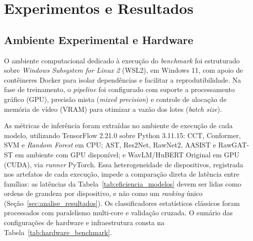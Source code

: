 \documentclass[12pt,a4paper]{article}
\begin{document}
\newpage


\section{Experimentos e Resultados}
\label{sec:resultados}

\subsection{Ambiente Experimental e Hardware}
\label{sec:ambiente_experimental}

O ambiente computacional dedicado à execução do \textit{benchmark} foi
estruturado sobre \textit{Windows Subsystem for Linux 2} (WSL2), em Windows 11,
com apoio de contêineres Docker para isolar dependências e facilitar a
reprodutibilidade. Na fase de treinamento, o \textit{pipeline} foi configurado
com suporte a processamento gráfico (GPU), precisão mista (\textit{mixed
precision}) e controle de alocação de memória de vídeo (VRAM) para otimizar a
vazão dos lotes (\textit{batch size}).

As métricas de inferência foram extraídas no ambiente de execução de cada
modelo, utilizando TensorFlow 2.21.0 sobre Python 3.11.15: CCT, Conformer, SVM
e \textit{Random Forest} em CPU; AST, Res2Net, RawNet2, AASIST e RawGAT-ST em
ambiente com GPU disponível; e WavLM/HuBERT Original em GPU (CUDA), via
\textit{runner} PyTorch. Essa heterogeneidade de dispositivos, registrada nos
artefatos de cada execução, impede a comparação direta de latência entre
famílias: as latências da Tabela~\ref{tab:eficiencia_modelos} devem ser lidas
como ordens de grandeza por dispositivo, e não como um \textit{ranking} único
(Seção~\ref{sec:analise_resultados}). Os classificadores estatísticos
clássicos foram processados com paralelismo multi-core e validação cruzada. O
sumário das configurações de hardware e infraestrutura consta na
Tabela~\ref{tab:hardware_benchmark}.
\end{document}

